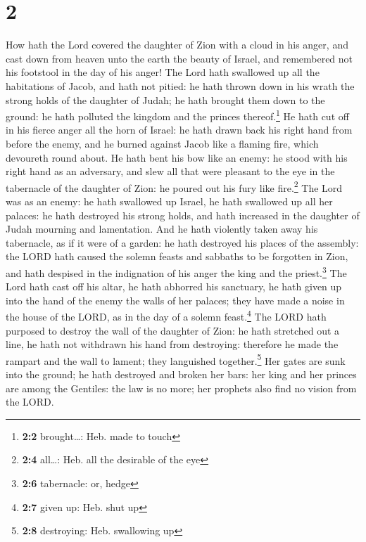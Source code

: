 \hypertarget{section-1}{%
\section{2}\label{section-1}}

 How hath the Lord covered the daughter of Zion with a
cloud in his anger, and cast down from heaven unto the earth the beauty
of Israel, and remembered not his footstool in the day of his anger!
 The Lord hath swallowed up all the habitations of Jacob,
and hath not pitied: he hath thrown down in his wrath the strong holds
of the daughter of Judah; he hath brought them down to the ground: he
hath polluted the kingdom and the princes thereof.\footnote{\textbf{2:2}
  brought\ldots: Heb. made to touch}  He hath cut off in
his fierce anger all the horn of Israel: he hath drawn back his right
hand from before the enemy, and he burned against Jacob like a flaming
fire, which devoureth round about.  He hath bent his bow
like an enemy: he stood with his right hand as an adversary, and slew
all that were pleasant to the eye in the tabernacle of the daughter of
Zion: he poured out his fury like fire.\footnote{\textbf{2:4} all\ldots:
  Heb. all the desirable of the eye}  The Lord was as an
enemy: he hath swallowed up Israel, he hath swallowed up all her
palaces: he hath destroyed his strong holds, and hath increased in the
daughter of Judah mourning and lamentation.  And he hath
violently taken away his tabernacle, as if it were of a garden: he hath
destroyed his places of the assembly: the LORD hath caused the solemn
feasts and sabbaths to be forgotten in Zion, and hath despised in the
indignation of his anger the king and the priest.\footnote{\textbf{2:6}
  tabernacle: or, hedge}  The Lord hath cast off his
altar, he hath abhorred his sanctuary, he hath given up into the hand of
the enemy the walls of her palaces; they have made a noise in the house
of the LORD, as in the day of a solemn feast.\footnote{\textbf{2:7}
  given up: Heb. shut up}  The LORD hath purposed to
destroy the wall of the daughter of Zion: he hath stretched out a line,
he hath not withdrawn his hand from destroying: therefore he made the
rampart and the wall to lament; they languished together.\footnote{\textbf{2:8}
  destroying: Heb. swallowing up}  Her gates are sunk into
the ground; he hath destroyed and broken her bars: her king and her
princes are among the Gentiles: the law is no more; her prophets also
find no vision from the LORD.


